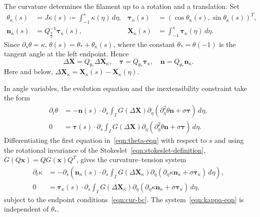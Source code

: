 \documentclass[11pt,reqno]{amsart}
\theoremstyle{plain}
\theoremstyle{definition}
\numberwithin{equation}{section}
\newcommand{\paren}[1]{\left(#1\right)}
\newcommand{\p}{\partial}
\newcommand{\bm}[1]{\boldsymbol{#1}}
\newcommand{\thk}{\theta_\kappa}
\newcommand{\tk}{\bm\tau_\kappa}
\newcommand{\nk}{\bm n_\kappa}
\newcommand{\xk}{\bm X_\kappa}
\begin{document}
The curvature determines the filament up to a rotation and a
translation. Set
\begin{equation}\label{eqn:normalized-geometry}
\begin{aligned}
    \thk(s)&=J\kappa(s)\coloneqq\int_{-1}^s\kappa(\eta)\,d\eta,
    &\tk(s)&=\paren{\cos\thk(s),\sin\thk(s)}^T,\\
    \nk(s)&=Q_{\frac{\pi}{2}}^{-1}\tk(s),
    &\xk(s)&=\int_{-1}^s\tk(\eta)\,d\eta.
\end{aligned}
\end{equation}
Since $\p_s\theta=\kappa$,
$\theta(s)=\theta_*+\thk(s)$, where the constant
$\theta_*=\theta(-1)$ is the tangent angle at the left endpoint. Hence
\begin{equation}
    \Delta\bm X=Q_{\theta_*}\Delta\xk,
    \quad
    \bm\tau=Q_{\theta_*}\tk,
    \quad
    \bm n=Q_{\theta_*}\nk.
\end{equation}
Here and below,
$\Delta\xk=\xk(s)-\xk(\eta)$.

In angle variables, the evolution equation and the inextensibility constraint
take the form
\begin{subequations}\label{eqn:theta-eqn}
\begin{align}
    \p_t\theta &= - \bm n(s)\cdot\p_s\int_I G(\Delta\bm X)\p_\eta\paren{ \p_\eta^2\theta\bm n+\sigma\bm \tau } \,d\eta ,\\
     0&= \bm\tau(s) \cdot\p_s\int_I G(\Delta\bm X)\p_\eta\paren{ \p_\eta^2\theta \bm n + \sigma\bm \tau } \,d\eta.
\end{align}
\end{subequations}
Differentiating the first equation in~\eqref{eqn:theta-eqn} with respect to $s$ and using the rotational
invariance of the Stokeslet~\eqref{eqn:stokeslet-definition}, $G(Q\bm x)=QG(\bm x)Q^T$, gives the
curvature--tension system
\begin{subequations}\label{eqn:kappa-eqn}
\begin{align}
    \p_t\kappa
    &= -\p_s\paren{\nk(s)\cdot\p_s\int_I
    G(\Delta\xk)\p_\eta\paren{
    \p_\eta\kappa\nk+\sigma\tk}\,d\eta},\\
    0
    &= \tk(s)\cdot\p_s\int_I
    G(\Delta\xk)\p_\eta\paren{
    \p_\eta\kappa\nk+\sigma\tk}\,d\eta,
\end{align}
\end{subequations}
subject to the endpoint conditions~\eqref{eqn:cur-bc}.
The system~\eqref{eqn:kappa-eqn} is independent of
$\theta_*$.
\end{document}
